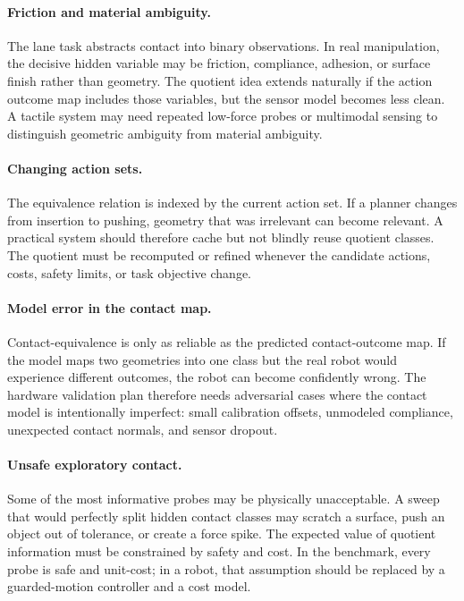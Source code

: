 \documentclass{article}
\begin{document}
\paragraph{Friction and material ambiguity.}
The lane task abstracts contact into binary observations. In real manipulation, the decisive hidden variable may be friction, compliance, adhesion, or surface finish rather than geometry. The quotient idea extends naturally if the action outcome map includes those variables, but the sensor model becomes less clean. A tactile system may need repeated low-force probes or multimodal sensing to distinguish geometric ambiguity from material ambiguity.

\paragraph{Changing action sets.}
The equivalence relation is indexed by the current action set. If a planner changes from insertion to pushing, geometry that was irrelevant can become relevant. A practical system should therefore cache but not blindly reuse quotient classes. The quotient must be recomputed or refined whenever the candidate actions, costs, safety limits, or task objective change.

\paragraph{Model error in the contact map.}
Contact-equivalence is only as reliable as the predicted contact-outcome map. If the model maps two geometries into one class but the real robot would experience different outcomes, the robot can become confidently wrong. The hardware validation plan therefore needs adversarial cases where the contact model is intentionally imperfect: small calibration offsets, unmodeled compliance, unexpected contact normals, and sensor dropout.

\paragraph{Unsafe exploratory contact.}
Some of the most informative probes may be physically unacceptable. A sweep that would perfectly split hidden contact classes may scratch a surface, push an object out of tolerance, or create a force spike. The expected value of quotient information must be constrained by safety and cost. In the benchmark, every probe is safe and unit-cost; in a robot, that assumption should be replaced by a guarded-motion controller and a cost model.
\end{document}

